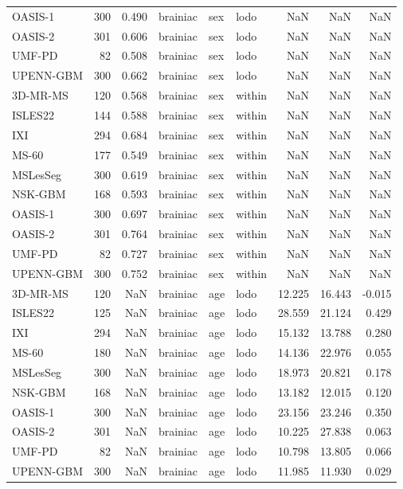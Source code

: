 \begin{tabular}{lrrlllrrr}
OASIS-1 & 300 & 0.490 & brainiac & sex & lodo & NaN & NaN & NaN \\
OASIS-2 & 301 & 0.606 & brainiac & sex & lodo & NaN & NaN & NaN \\
UMF-PD & 82 & 0.508 & brainiac & sex & lodo & NaN & NaN & NaN \\
UPENN-GBM & 300 & 0.662 & brainiac & sex & lodo & NaN & NaN & NaN \\
3D-MR-MS & 120 & 0.568 & brainiac & sex & within & NaN & NaN & NaN \\
ISLES22 & 144 & 0.588 & brainiac & sex & within & NaN & NaN & NaN \\
IXI & 294 & 0.684 & brainiac & sex & within & NaN & NaN & NaN \\
MS-60 & 177 & 0.549 & brainiac & sex & within & NaN & NaN & NaN \\
MSLesSeg & 300 & 0.619 & brainiac & sex & within & NaN & NaN & NaN \\
NSK-GBM & 168 & 0.593 & brainiac & sex & within & NaN & NaN & NaN \\
OASIS-1 & 300 & 0.697 & brainiac & sex & within & NaN & NaN & NaN \\
OASIS-2 & 301 & 0.764 & brainiac & sex & within & NaN & NaN & NaN \\
UMF-PD & 82 & 0.727 & brainiac & sex & within & NaN & NaN & NaN \\
UPENN-GBM & 300 & 0.752 & brainiac & sex & within & NaN & NaN & NaN \\
3D-MR-MS & 120 & NaN & brainiac & age & lodo & 12.225 & 16.443 & -0.015 \\
ISLES22 & 125 & NaN & brainiac & age & lodo & 28.559 & 21.124 & 0.429 \\
IXI & 294 & NaN & brainiac & age & lodo & 15.132 & 13.788 & 0.280 \\
MS-60 & 180 & NaN & brainiac & age & lodo & 14.136 & 22.976 & 0.055 \\
MSLesSeg & 300 & NaN & brainiac & age & lodo & 18.973 & 20.821 & 0.178 \\
NSK-GBM & 168 & NaN & brainiac & age & lodo & 13.182 & 12.015 & 0.120 \\
OASIS-1 & 300 & NaN & brainiac & age & lodo & 23.156 & 23.246 & 0.350 \\
OASIS-2 & 301 & NaN & brainiac & age & lodo & 10.225 & 27.838 & 0.063 \\
UMF-PD & 82 & NaN & brainiac & age & lodo & 10.798 & 13.805 & 0.066 \\
UPENN-GBM & 300 & NaN & brainiac & age & lodo & 11.985 & 11.930 & 0.029 \\

\end{tabular}
